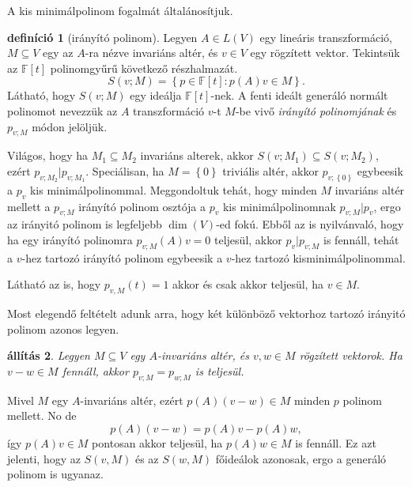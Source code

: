 \documentclass[a4paper, showtrims]{memoir}
\makeatletter
\renewenvironment{proof}[1][\proofname]
    {\par\pushQED{\qed}%
    \normalfont \topsep6\p@\@plus6\p@\relax
    \trivlist
    \item[\hskip\labelsep
        \itshape
    #1\@addpunct{:}]\ignorespaces}
    {\popQED\endtrivlist\@endpefalse}
\theoremstyle{plain}
\newtheorem{proposition}{állítás}[chapter]
\theoremstyle{remark}
\theoremstyle{definition}
\newtheorem{definition}[proposition]{definíció}
\makeatother
\begin{document}
A kis minimálpolinom fogalmát általánosítjuk.
\begin{definition}[irányító polinom]
    Legyen $A\in L\left( V \right)$ egy lineáris transzformáció,
    $M\subseteq V$ egy az $A$-ra nézve invariáns altér, 
    és $v\in V$ egy rögzített vektor.
    Tekintsük az $\mathbb{F}\left[ t \right]$ polinomgyűrű következő részhalmazát.
    \[
        S\left( v;M \right)
        =
        \left\{ p\in\mathbb{F}\left[ t \right]:p\left( A \right)v\in M \right\}.
    \]
    Látható, hogy $S\left( v;M \right)$ egy ideálja $\mathbb{F}\left[ t \right]$-nek.
    A fenti ideált generáló normált polinomot nevezzük az $A$ transzformáció $v$-t $M$-be vivő \emph{irányító polinomjának}
    és $p_{v;M}$ módon jelöljük.
\end{definition}
Világos, hogy ha $M_1\subseteq M_2$ invariáns alterek, akkor $S\left( v;M_1 \right)\subseteq S\left( v;M_2 \right)$, 
ezért $p_{v;M_2}|p_{v;M_1}$.
Speciálisan, ha $M=\left\{ 0 \right\}$ triviális altér, akkor $p_{v;\left\{ 0 \right\}}$ egybeesik a $p_{v}$ kis minimálpolinommal.
Meggondoltuk tehát, hogy minden $M$ invariáns altér mellett a $p_{v;M}$ irányító polinom osztója a $p_v$ kis minimálpolinomnak $p_{v;M}|p_v$, ergo az irányitó polinom is legfeljebb $\dim\left( V \right)$-ed fokú.
Ebből az is nyilvánvaló, hogy ha egy irányító polinomra $p_{v;M}\left( A \right)v=0$ teljesül,
akkor $p_{v}|p_{v;M}$ is fennáll, 
tehát a $v$-hez tartozó irányító polinom egybeesik a $v$-hez tartozó kisminimálpolinommal.

Látható az is, hogy $p_{v,M}\left( t \right)=1$ akkor és csak akkor teljesül, ha $v\in M$.

Most elegendő feltételt adunk arra, 
hogy két különböző vektorhoz tartozó irányitó polinom azonos legyen.
\begin{proposition}
    Legyen $M\subseteq V$ egy $A$-invariáns altér, 
    és $v,w\in M$ rögzített vektorok.
    Ha $v-w\in M$ fennáll, akkor $p_{v;M}=p_{w;M}$ is teljesül.
\end{proposition}
\begin{proof}
    Mivel $M$ egy $A$-invariáns altér, ezért $p\left( A \right)\left( v-w \right)\in M$ minden $p$ polinom mellett.
    No de
    \[
        p\left( A \right)\left( v-w \right)=p\left( A \right)v-p\left( A \right)w,
    \]
    így $p\left( A \right)v\in M$ pontosan akkor teljesül, ha $p\left( A \right)w\in M$ is fennáll.
    Ez azt jelenti, hogy az $S\left( v,M \right)$ és az $S\left( w,M \right)$ főideálok azonosak,
    ergo a generáló polinom is ugyanaz.
\end{proof}
\end{document}
